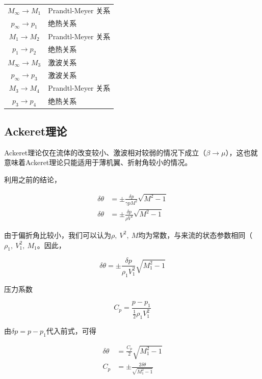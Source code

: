 \begin{table}[!h]
    \begin{tabular}{cl}
        $M_{\infty} \rightarrow M_{1}$    &   Prandtl-Meyer 关系 \\ 
        $p_{\infty} \rightarrow p_{1}$  &   绝热关系 \\ 
        $M_{1} \rightarrow M_{2}$    &   Prandtl-Meyer 关系 \\ 
        $p_{1} \rightarrow p_{2}$  &   绝热关系 \\ 
        $M_{\infty} \rightarrow M_{3}$    &   激波关系 \\ 
        $p_{\infty} \rightarrow p_{3}$  &   激波关系 \\ 
        $M_{3} \rightarrow M_{4}$    &   Prandtl-Meyer 关系 \\ 
        $p_{3} \rightarrow p_{4}$  &   绝热关系
    \end{tabular}
\end{table}

\subsection{Ackeret理论}

Ackeret理论仅在流体的改变较小、激波相对较弱的情况下成立（$\beta\rightarrow\mu$），这也就意味着Ackeret理论只能适用于薄机翼、折射角较小的情况。

利用之前的结论，

\begin{align*}
    \delta \theta&=\pm \frac{\delta p}{\gamma p M^{2}} \sqrt{M^{2}-1}\\ 
    \delta \theta&=\pm \frac{\delta p}{\rho V^{2}} \sqrt{M^{2}-1}
\end{align*}

由于偏折角比较小，我们可以认为$\rho,\ V^2,\ M$均为常数，与来流的状态参数相同（$\rho_1,\ V_1^2,\ M_1$。因此，

\begin{equation*}
    \delta \theta=\pm \frac{\delta p}{\rho_{1} V_{1}^{2}} \sqrt{M_{1}^{2}-1}
\end{equation*}

压力系数

\begin{equation*}
    C_p=\frac{p-p_1}{\frac{1}{2}\rho_1V_1^2}
\end{equation*}

由$\delta p=p-p_1$代入前式，可得

\begin{align*}
    \delta \theta&=\frac{C_{p}}{2} \sqrt{M_{1}^{2}-1}\\ 
    C_{p}&=\pm \frac{2 \delta \theta}{\sqrt{M_{1}^{2}-1}}
\end{align*}

